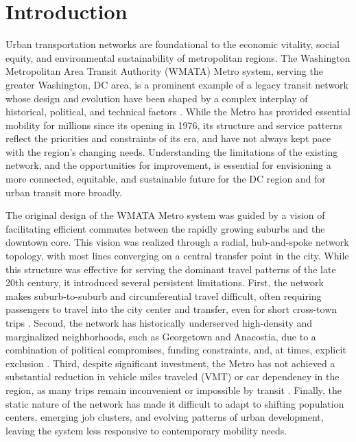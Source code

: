 \documentclass[manuscript,screen,review]{acmart}
\begin{document}

\maketitle

\section{Introduction}

Urban transportation networks are foundational to the economic vitality, social equity, and environmental sustainability of metropolitan regions. The Washington Metropolitan Area Transit Authority (WMATA) Metro system, serving the greater Washington, DC area, is a prominent example of a legacy transit network whose design and evolution have been shaped by a complex interplay of historical, political, and technical factors \cite{bib:wmata-history}. While the Metro has provided essential mobility for millions since its opening in 1976, its structure and service patterns reflect the priorities and constraints of its era, and have not always kept pace with the region's changing needs. Understanding the limitations of the existing network, and the opportunities for improvement, is essential for envisioning a more connected, equitable, and sustainable future for the DC region and for urban transit more broadly.

The original design of the WMATA Metro system was guided by a vision of facilitating efficient commutes between the rapidly growing suburbs and the downtown core. This vision was realized through a radial, hub-and-spoke network topology, with most lines converging on a central transfer point in the city. While this structure was effective for serving the dominant travel patterns of the late 20th century, it introduced several persistent limitations. First, the network makes suburb-to-suburb and circumferential travel difficult, often requiring passengers to travel into the city center and transfer, even for short cross-town trips \cite{bib:bast2016route}. Second, the network has historically underserved high-density and marginalized neighborhoods, such as Georgetown and Anacostia, due to a combination of political compromises, funding constraints, and, at times, explicit exclusion \cite{bib:overview-field}. Third, despite significant investment, the Metro has not achieved a substantial reduction in vehicle miles traveled (VMT) or car dependency in the region, as many trips remain inconvenient or impossible by transit \cite{bib:wmata-vmt}. Finally, the static nature of the network has made it difficult to adapt to shifting population centers, emerging job clusters, and evolving patterns of urban development, leaving the system less responsive to contemporary mobility needs.
\end{document}
